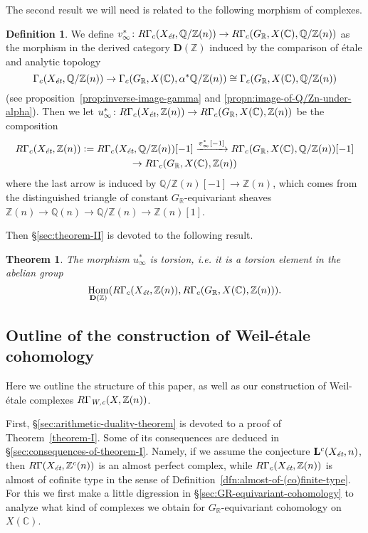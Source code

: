 \documentclass[draft,leqno,12pt]{article}
\theoremstyle{plain}
\newtheorem{maintheorem}{Theorem}
\theoremstyle{definition}
\newtheorem{definition}[theorem]{\indent\sc Definition}
\DeclareMathOperator{\Hom}{Hom}
\newcommand{\ZZ}{\mathbb{Z}}
\newcommand{\QQ}{\mathbb{Q}}
\newcommand{\RR}{\mathbb{R}}
\newcommand{\CC}{\mathbb{C}}
\newcommand{\dfn}{\mathrel{\mathop:}=}
\newcommand{\Wc}{\text{\it W,c}}
\newcommand{\et}{\text{\it \'{e}t}}
\begin{document}
The second result we will need is related to the following morphism of
complexes.

\begin{definition}
  \label{dfn:u-infty}
  We define
  $v_\infty^*\colon R\Gamma_c (X_\et, \QQ/\ZZ (n)) \to R\Gamma_c (G_\RR, X (\CC), \QQ/\ZZ (n))$
  as the morphism in the derived category $\mathbf{D} (\ZZ)$ induced by the
  comparison of \'{e}tale and analytic topology
  \[ \Gamma_c (X_\et, \QQ/\ZZ (n)) \to
  \Gamma_c (G_\RR, X (\CC), \alpha^* \QQ/\ZZ (n)) \cong
  \Gamma_c (G_\RR, X (\CC), \QQ/\ZZ (n)) \]
  (see proposition~\ref{prop:inverse-image-gamma} and
  \ref{propn:image-of-Q/Zn-under-alpha}). Then we let
  $u_\infty^*\colon R\Gamma_c (X_\et, \ZZ(n)) \to R\Gamma_c (G_\RR, X (\CC), \ZZ (n))$
  be the composition
  \begin{multline*}
    R\Gamma_c (X_\et, \ZZ(n)) \dfn R\Gamma_c (X_\et, \QQ/\ZZ (n)) [-1]
    \xrightarrow{v_\infty^* [-1]} R\Gamma_c (G_\RR, X (\CC), \QQ/\ZZ (n)) [-1]
    \\ \to R\Gamma_c (G_\RR, X (\CC), \ZZ (n))
  \end{multline*}
  where the last arrow is induced by $\QQ/\ZZ (n) [-1] \to \ZZ (n)$, which comes
  from the distinguished triangle of constant $G_\RR$-equivariant sheaves
  $\ZZ (n) \to \QQ (n) \to \QQ/\ZZ (n) \to \ZZ (n) [1]$.
\end{definition}

Then \S\ref{sec:theorem-II} is devoted to the following result.

\begin{maintheorem}
  \label{theorem-II}
  The morphism $u_\infty^*$ is torsion, i.e. it is a torsion element in the
  abelian group
  $$\Hom_{\mathbf{D} (\ZZ)} (R\Gamma_c (X_\et, \ZZ(n)), R\Gamma_c (G_\RR, X (\CC), \ZZ(n))).$$
\end{maintheorem}

\subsection*{Outline of the construction of Weil-\'{e}tale cohomology}

Here we outline the structure of this paper, as well as our construction of
Weil-\'{e}tale complexes $R\Gamma_\Wc (X, \ZZ (n))$.

First, \S\ref{sec:arithmetic-duality-theorem} is devoted to a proof of
Theorem~\ref{theorem-I}. Some of its consequences are deduced in
\S\ref{sec:consequences-of-theorem-I}. Namely, if we assume the conjecture
$\mathbf{L}^c (X_\et, n)$, then $R\Gamma (X_\et, \ZZ^c (n))$ is an almost
perfect complex, while $R\Gamma_c (X_\et, \ZZ (n))$ is almost of cofinite type
in the sense of Definition~\ref{dfn:almost-of-(co)finite-type}. For this we
first make a little digression in \S\ref{sec:GR-equivariant-cohomology} to
analyze what kind of complexes we obtain for $G_\RR$-equivariant cohomology on
$X (\CC)$.
\end{document}
